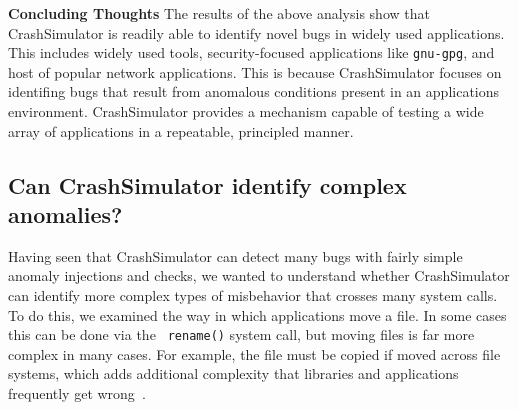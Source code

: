 {\bf Concluding Thoughts}
The results of the above analysis show that CrashSimulator is readily able to
identify novel bugs in widely used applications.  This includes
widely used tools, security-focused applications like {\tt gnu-gpg}, and 
host of popular network applications.  This is
because CrashSimulator focuses on identifing bugs that result from anomalous
conditions present in an applications environment.  CrashSimulator provides
a mechanism capable of testing a wide array of applications in a
repeatable, principled manner.



\subsection{Can CrashSimulator identify complex anomalies?}
\label{sec-complex}


Having seen that CrashSimulator can detect many bugs with fairly 
simple anomaly injections and checks,
we wanted to understand whether CrashSimulator can identify more complex types
of misbehavior that crosses many system calls.  To do this, we examined the
way in which applications move a file.  In some cases this can be done via the {\tt
rename()} system call, but moving files is far more complex in
many cases.  For example, the file must be copied if moved across file
systems, which adds additional complexity that libraries and applications
frequently get wrong~\cite{PHPRenameBug,PythonShutilBug,NodejsCopyBug}.

